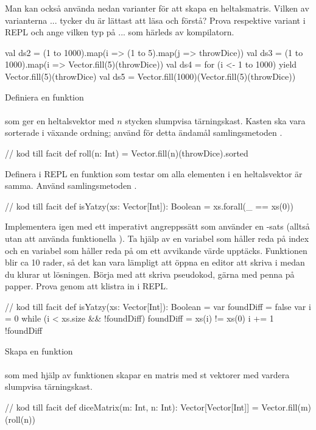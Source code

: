 \Subtask\Pen Man kan också använda nedan varianter för att skapa en heltalsmatris. Vilken av varianterna  ...  tycker du är lättast att läsa och förstå? Prova respektive variant i REPL och ange vilken typ på  ...  som härleds av kompilatorn.
\begin{REPL}
val ds2 = (1 to 1000).map(i => (1 to 5).map(j => throwDice))  
val ds3 = (1 to 1000).map(i => Vector.fill(5)(throwDice)) 
val ds4 = for (i <- 1 to 1000) yield Vector.fill(5)(throwDice) 
val ds5 = Vector.fill(1000)(Vector.fill(5)(throwDice))
\end{REPL}


\Subtask Definiera en funktion \\ \\ som ger en heltalsvektor med $n$ stycken slumpvisa tärningskast. Kasten ska vara sorterade i växande ordning; använd för detta ändamål samlingsmetoden .
\begin{Code}
// kod till facit
def roll(n: Int) = Vector.fill(n)(throwDice).sorted
\end{Code}


\Subtask Definera i REPL en funktion  som testar om alla elementen i en heltalsvektor är samma. Använd samlingsmetoden . 
\begin{Code}
// kod till facit
def isYatzy(xs: Vector[Int]): Boolean = xs.forall(_ == xs(0))
\end{Code}

\Subtask Implementera  igen med ett imperativt angreppssätt som använder en -sats (alltså utan att använda funktionella  ). Ta hjälp av en variabel  som håller reda på index och en variabel  som håller reda på om ett avvikande värde upptäcks. Funktionen blir ca 10 rader, så det kan vara lämpligt att öppna en editor att skriva i medan du klurar ut lösningen. Börja med att skriva pseudokod, gärna med penna på papper. Prova genom att klistra in i REPL. 
\begin{Code}
// kod till facit
def isYatzy(xs: Vector[Int]): Boolean = {
  var foundDiff = false
  var i = 0
  while (i < xs.size  && !foundDiff){
    foundDiff = xs(i) != xs(0)
    i += 1
  } 
  !foundDiff
}
\end{Code}


\Subtask Skapa en funktion  \\  \\ som med hjälp av funktionen  skapar en matris med  st vektorer med vardera  slumpvisa tärningskast.
\begin{Code}
// kod till facit
def diceMatrix(m: Int, n: Int): Vector[Vector[Int]] = 
  Vector.fill(m)(roll(n))
\end{Code}

